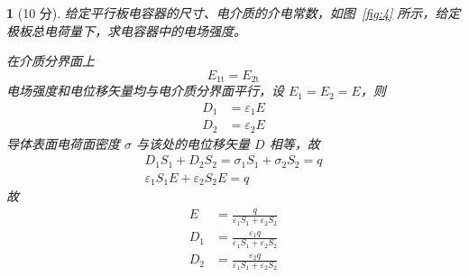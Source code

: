 \documentclass{book}
\theoremstyle{change}
\newtheorem{ti}{}[section]
\begin{document}
\begin{ti}[10 分]
	给定平行板电容器的尺寸、电介质的介电常数，如图~\ref{fig:4} 所示，给定极板总电荷量下，求电容器中的电场强度。
	\begin{solution}
		在介质分界面上
		\[
			E_{1\mathrm{t}} = E_{2\mathrm{t}}
		\]
		电场强度和电位移矢量均与电介质分界面平行，设 $E_{1} = E_{2} = E$，则
		\begin{align*}
			D_{1} &= \varepsilon_{1} E\\
			D_{2} &= \varepsilon_{2} E
		\end{align*}
		导体表面电荷面密度 $\sigma$ 与该处的电位移矢量 $D$ 相等，故
		\begin{gather*}
			D_{1} S_{1} + D_{2} S_{2} = \sigma_{1} S_{1} + \sigma_{2} S_{2} = q\\
			\varepsilon_{1} S_{1} E + \varepsilon_{2} S_{2} E = q
		\end{gather*}
		故
		\begin{align*}
			E &= \frac{q}{\varepsilon_{1} S_{1} + \varepsilon_{2} S_{2}}\\
			D_{1} &= \frac{\varepsilon_{1} q}{\varepsilon_{1} S_{1} + \varepsilon_{2} S_{2}}\\
			D_{2} &= \frac{\varepsilon_{2} q}{\varepsilon_{1} S_{1} + \varepsilon_{2} S_{2}}
		\end{align*}
	\end{solution}
\end{ti}
\end{document}
